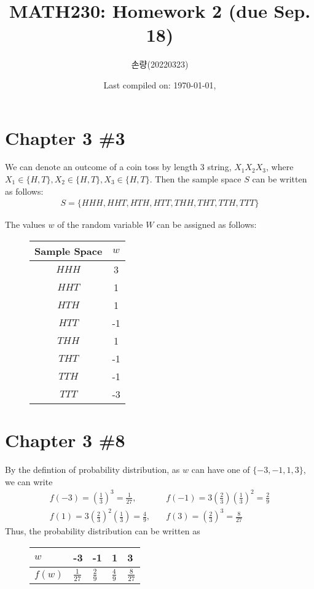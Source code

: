 \documentclass{scrartcl}
\title{MATH230: Homework 2 (due Sep. 18)}
\author{손량(20220323)}
\date{Last compiled on: \today, \currenttime}
\begin{document}
\maketitle

\section{Chapter 3 \#3}
We can denote an outcome of a coin toss by length 3 string, \(X_1 X_2 X_3\),
where \(X_1 \in \{H, T\}, X_2 \in \{H, T\}, X_3 \in \{H, T\}\). Then the sample
space \(S\) can be written as follows:
\begin{align*}
  S = \{HHH, HHT, HTH, HTT, THH, THT, TTH, TTT\}
\end{align*}

The values \(w\) of the random variable \(W\) can be assigned as follows:
\begin{figure}[H]
  \centering
  \begin{tabular}{|c|c|}
  \hline
  Sample Space & $w$ \\
  \hline
  \(HHH\)        & 3   \\
  \(HHT\)        & 1   \\
  \(HTH\)        & 1   \\
  \(HTT\)        & -1  \\
  \(THH\)        & 1   \\
  \(THT\)        & -1  \\
  \(TTH\)        & -1  \\
  \(TTT\)        & -3  \\
  \hline
  \end{tabular}
\end{figure}

\section{Chapter 3 \#8}
By the defintion of probability distribution, as \(w\) can have one of \(\{-3,
-1, 1, 3\}\), we can write
\begin{align*}
  f(-3) = \left( \frac{1}{3} \right)^3 = \frac{1}{27}, &\quad
  f(-1) = 3 \left( \frac{2}{3} \right) \left( \frac{1}{3} \right)^2
  = \frac{2}{9} \\
  f(1) = 3 \left( \frac{2}{3} \right)^2 \left( \frac{1}{3} \right)
  = \frac{4}{9}, &\quad
  f(3) = \left( \frac{2}{3} \right)^3 = \frac{8}{27}
\end{align*}
Thus, the probability distribution can be written as
\begin{figure}[H]
  \centering
  \begin{tabular}{|l|llll|}
  \hline
  \(w\)    & -3               & -1              & 1               & 3                \\
  \hline
  \(f(w)\) & \(\frac{1}{27}\) & \(\frac{2}{9}\) & \(\frac{4}{9}\) &
  \(\frac{8}{27}\) \\
  \hline
  \end{tabular}
\end{figure}
\end{document}
